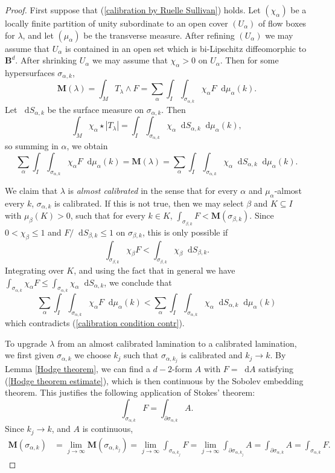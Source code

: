 \documentclass[reqno,11pt]{amsart}
\newcommand{\Ball}{\mathbf{B}}
\newcommand*\dif{\mathop{}\!\mathrm{d}}
\newcommand{\Mass}{\mathbf M}
\newcommand{\dfn}[1]{\emph{#1}\index{#1}}
\theoremstyle{definition}
\numberwithin{equation}{section}
\begin{document}
\begin{proof}
First suppose that (\ref{calibration by Ruelle Sullivan}) holds.
Let $(\chi_\alpha)$ be a locally finite partition of unity subordinate to an open cover $(U_\alpha)$ of flow boxes for $\lambda$, and let $(\mu_\alpha)$ be the transverse measure.
After refining $(U_\alpha)$ we may assume that $U_\alpha$ is contained in an open set which is bi-Lipschitz diffeomorphic to $\Ball^d$. After shrinking $U_\alpha$ we may assume that $\chi_\alpha > 0$ on $U_\alpha$.
Then for some hypersurfaces $\sigma_{\alpha,k}$,
$$\Mass(\lambda) = \int_M T_\lambda \wedge F = \sum_\alpha \int_I \int_{\sigma_{\alpha,k}} \chi_\alpha F \dif \mu_\alpha(k).$$
Let $\dif S_{\alpha,k}$ be the surface measure on $\sigma_{\alpha,k}$. Then
$$\int_M \chi_\alpha \star |T_\lambda| = \int_I \int_{\sigma_{\alpha,k}} \chi_\alpha \dif S_{\alpha,k} \dif \mu_\alpha(k),$$
so summing in $\alpha$, we obtain 
\begin{equation}\label{calibration condition contr}
\sum_\alpha \int_I \int_{\sigma_{\alpha,k}} \chi_\alpha F \dif \mu_\alpha(k) = \Mass(\lambda) = \sum_\alpha \int_I \int_{\sigma_{\alpha,k}} \chi_\alpha \dif S_{\alpha,k} \dif \mu_\alpha(k).
\end{equation}

We claim that $\lambda$ is \dfn{almost calibrated} in the sense that for every $\alpha$ and $\mu_\alpha$-almost every $k$, $\sigma_{\alpha, k}$ is calibrated.
If this is not true, then we may select $\beta$ and $K \subseteq I$ with $\mu_\beta(K) > 0$, such that for every $k \in K$, $\int_{\sigma_{\beta, k}} F < \Mass(\sigma_{\beta, k})$.
Since $0 < \chi_\beta \leq 1$ and $F/\dif S_{\beta, k} \leq 1$ on $\sigma_{\beta, k}$, this is only possible if 
$$\int_{\sigma_{\beta, k}} \chi_\beta F < \int_{\sigma_{\beta, k}} \chi_\beta \dif S_{\beta, k}.$$
Integrating over $K$, and using the fact that in general we have $\int_{\sigma_{\alpha, k}} \chi_\alpha F \leq \int_{\sigma_{\alpha, k}} \chi_\alpha \dif S_{\alpha, k}$, we conclude that 
$$\sum_\alpha \int_I \int_{\sigma_{\alpha, k}} \chi_\alpha F \dif \mu_\alpha(k) < \sum_\alpha \int_I \int_{\sigma_{\alpha, k}} \chi_\alpha \dif S_{\alpha, k} \dif \mu_\alpha(k)$$
which contradicts (\ref{calibration condition contr}).

To upgrade $\lambda$ from an almost calibrated lamination to a calibrated lamination, we first 
given $\sigma_{\alpha, k}$ we choose $k_j$ such that $\sigma_{\alpha, k_j}$ is calibrated and $k_j \to k$.
By Lemma \ref{Hodge theorem}, we can find a $d - 2$-form $A$ with $F = \dif A$ satisfying (\ref{Hodge theorem estimate}), which is then continuous by the Sobolev embedding theorem.
This justifies the following application of Stokes' theorem: 
$$\int_{\sigma_{\alpha, k}} F = \int_{\partial \sigma_{\alpha, k}} A.$$
Since $k_j \to k$, and $A$ is continuous,
\begin{align*}
\Mass(\sigma_{\alpha, k}) &= \lim_{j \to \infty} \Mass(\sigma_{\alpha, k_j}) = \lim_{j \to \infty} \int_{\sigma_{\alpha, k_j}} F = \lim_{j \to \infty} \int_{\partial \sigma_{\alpha, k_j}} A = \int_{\partial \sigma_{\alpha, k}} A = \int_{\sigma_{\alpha, k}} F.
\end{align*}


\end{proof}
\end{document}
